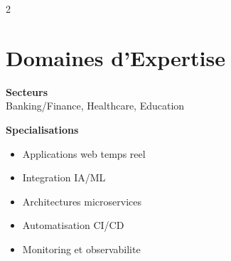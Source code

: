 \documentclass[10pt,a4paper]{article}
\begin{document}
\begin{multicols}{2}
\section*{Domaines d'Expertise}
\vspace{2pt}
{\small
\textbf{Secteurs}\\[1pt]
Banking/Finance, Healthcare, Education

\vspace{3pt}
\textbf{Specialisations}
\begin{itemize}[leftmargin=10pt,itemsep=2pt,topsep=2pt,parsep=0pt]
  \item Applications web temps reel
  \item Integration IA/ML
  \item Architectures microservices
  \item Automatisation CI/CD
  \item Monitoring et observabilite
\end{itemize}
}

\end{multicols}
\end{document}
